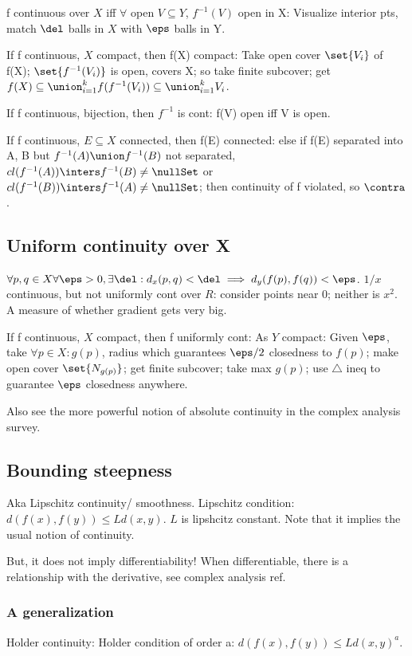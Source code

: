 \documentclass[oneside, article]{memoir}
\begin{document}
f continuous over $X$ iff $\forall$ open $V \subseteq Y$, $f^{-1}(V)$ open in X: Visualize interior pts, match $\del$ balls in $X$ with $\eps$ balls in Y.

If f continuous, $X$ compact, then f(X) compact: Take open cover $\set{V_{i}}$ of f(X); $\set{f^{-1}(V_{i})}$ is open, covers X; so take finite subcover; get \\
$f(X) \subseteq \union_{i=1}^{k} f(f^{-1}(V_{i})) \subseteq \union_{i=1}^{k} V_{i} $.

If f continuous, bijection, then $f^{-1}$ is cont: f(V) open iff V is open.

If f continuous, $E \subseteq X$ connected, then f(E) connected: else if f(E) separated into A, B but $f^{-1}(A) \union f^{-1}(B)$ not separated,  $cl(f^{-1}(A)) \inters f^{-1}(B) \neq \nullSet$ or $cl(f^{-1}(B)) \inters f^{-1}(A) \neq \nullSet$; then continuity of f violated, so $\contra$.

\subsection{Uniform continuity over X}
$\forall p, q \in X \forall \eps>0, \exists \del: \\
d_{x}(p,q) < \del \implies d_{y}(f(p), f(q)) < \eps$. $1/x$ continuous, but not uniformly cont over $R$: consider points near $0$; neither is $x^{2}$. A measure of whether gradient gets very big.

If f continuous, $X$ compact, then f uniformly cont: As $Y$ compact: Given $\eps$, take $\forall p \in X: g(p)$, radius which guarantees $\eps/2$ closedness to $f(p)$; make open cover $\set{N_{g(p)}}$; get finite subcover; take max $g(p)$; use $\triangle$ ineq to guarantee $\eps$ closedness anywhere.

Also see the more powerful notion of absolute continuity in the complex analysis survey.

\subsection{Bounding steepness}
Aka Lipschitz continuity/ smoothness. Lipschitz condition: $d(f(x), f(y)) \leq L d(x, y)$. $L$ is lipshcitz constant. Note that it implies the usual notion of continuity.

But, it does not imply differentiability! When differentiable, there is a relationship with the derivative, see complex analysis ref.

\subsubsection{A generalization}
Holder continuity: Holder condition of order a: $d(f(x), f(y)) \leq L d(x, y)^{a}$.
\end{document}
